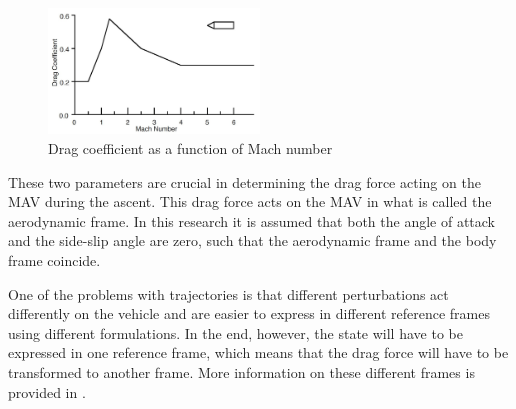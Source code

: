 \begin{figure}[H]
\centering
\includegraphics[width=0.5\textwidth]{figures/launcher_methods/dragcoeff_whitehead2004mars.jpg}
\caption{Drag coefficient as a function of Mach number \citep{whitehead2004mars}}
\label{fig:dragcoeff_whitehead2004mars}
\end{figure}

\noindent
These two parameters are crucial in determining the drag force acting on the \ac{MAV} during the ascent. This drag force acts on the \ac{MAV} in what is called the aerodynamic frame. In this research it is assumed that both the angle of attack and the side-slip angle are zero, such that the aerodynamic frame and the body frame coincide.

One of the problems with trajectories is that different perturbations act differently on the vehicle and are easier to express in different reference frames using different formulations. In the end, however, the state will have to be expressed in one reference frame, which means that the drag force will have to be transformed to another frame. More information on these different frames is provided in .




